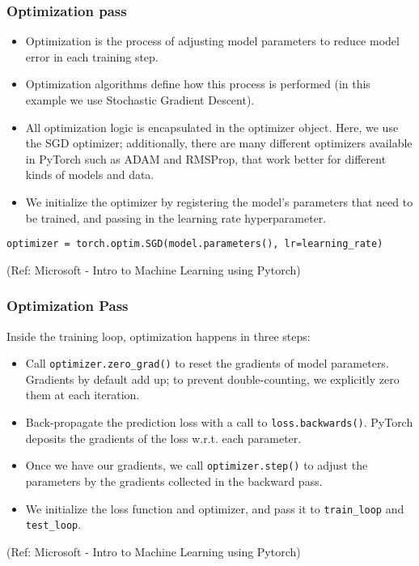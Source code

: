 \begin{frame}[fragile] \frametitle{Optimization pass}


\begin{itemize}
\item Optimization is the process of adjusting model parameters to reduce model error in each training step. 
\item Optimization algorithms define how this process is performed (in this example we use Stochastic Gradient Descent). 
\item All optimization logic is encapsulated in the optimizer object. Here, we use the SGD optimizer; additionally, there are many different optimizers available in PyTorch such as ADAM and RMSProp, that work better for different kinds of models and data.
\item We initialize the optimizer by registering the model's parameters that need to be trained, and passing in the learning rate hyperparameter.
\end{itemize}


\begin{lstlisting}
optimizer = torch.optim.SGD(model.parameters(), lr=learning_rate)
\end{lstlisting}

\tiny{(Ref: Microsoft - Intro to Machine Learning using Pytorch)}
\end{frame}

\begin{frame}[fragile] \frametitle{Optimization Pass}

Inside the training loop, optimization happens in three steps:

\begin{itemize}
\item Call \lstinline|optimizer.zero_grad()| to reset the gradients of model parameters. Gradients by default add up; to prevent double-counting, we explicitly zero them at each iteration.
\item Back-propagate the prediction loss with a call to \lstinline|loss.backwards()|. PyTorch deposits the gradients of the loss w.r.t. each parameter.
\item Once we have our gradients, we call \lstinline|optimizer.step()| to adjust the parameters by the gradients collected in the backward pass.
\item We initialize the loss function and optimizer, and pass it to \lstinline|train_loop| and \lstinline|test_loop|.
\end{itemize}


\tiny{(Ref: Microsoft - Intro to Machine Learning using Pytorch)}
\end{frame}

